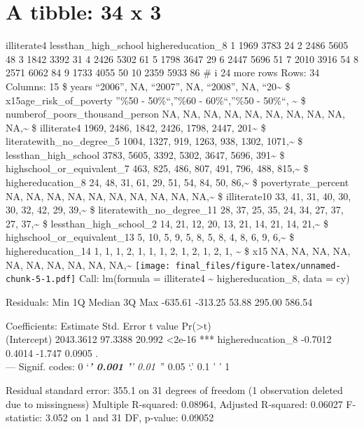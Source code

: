 \documentclass[
  12pt,
]{article}
\begin{document}
\hypertarget{a-tibble-34-x-3}{%
\section{A tibble: 34 x 3}\label{a-tibble-34-x-3}}

illiterate4 lessthan\_high\_school highereducation\_8
1 1969 3783 24
2 2486 5605 48
3 1842 3392 31
4 2426 5302 61
5 1798 3647 29
6 2447 5696 51
7 2010 3916 54
8 2571 6062 84
9 1733 4055 50
10 2359 5933 86
\# i 24 more rows
Rows: 34
Columns: 15
\$ years ``2006'', NA, ``2007'', NA, ``2008'', NA, ``20\textasciitilde{}
\$ x15age\_risk\_of\_poverty ''\%50 - 50\%``,''\%60 - 60\%``,''\%50 - 50\%``, \textasciitilde{}
\$ numberof\_poors\_thousand\_person NA, NA, NA, NA, NA, NA, NA, NA, NA, NA,\textasciitilde{}
\$ illiterate4 1969, 2486, 1842, 2426, 1798, 2447, 201\textasciitilde{}
\$ literatewith\_no\_degree\_5 1004, 1327, 919, 1263, 938, 1302, 1071,\textasciitilde{}
\$ lessthan\_high\_school 3783, 5605, 3392, 5302, 3647, 5696, 391\textasciitilde{}
\$ highschool\_or\_equivalent\_7 463, 825, 486, 807, 491, 796, 488, 815,\textasciitilde{}
\$ highereducation\_8 24, 48, 31, 61, 29, 51, 54, 84, 50, 86,\textasciitilde{}
\$ povertyrate\_percent NA, NA, NA, NA, NA, NA, NA, NA, NA, NA,\textasciitilde{}
\$ illiterate10 33, 41, 31, 40, 30, 30, 32, 42, 29, 39,\textasciitilde{}
\$ literatewith\_no\_degree\_11 28, 37, 25, 35, 24, 34, 27, 37, 27, 37,\textasciitilde{}
\$ lessthan\_high\_school\_2 14, 21, 12, 20, 13, 21, 14, 21, 14, 21,\textasciitilde{}
\$ highschool\_or\_equivalent\_13 5, 10, 5, 9, 5, 8, 5, 8, 4, 8, 6, 9, 6,\textasciitilde{}
\$ highereducation\_14 1, 1, 1, 2, 1, 1, 1, 2, 1, 2, 1, 2, 1, \textasciitilde{}
\$ x15 NA, NA, NA, NA, NA, NA, NA, NA, NA, NA,\textasciitilde{}
\texttt{[image: final\_files/figure-latex/unnamed-chunk-5-1.pdf]}
Call:
lm(formula = illiterate4 \textasciitilde{} highereducation\_8, data = cy)

Residuals:
Min 1Q Median 3Q Max
-635.61 -313.25 53.88 295.00 586.54

Coefficients:
Estimate Std. Error t value Pr(\textgreater\textbar t\textbar)\\
(Intercept) 2043.3612 97.3388 20.992 \textless2e-16 ***
highereducation\_8 -0.7012 0.4014 -1.747 0.0905 .\\
---
Signif. codes: 0 `\emph{\textbf{' 0.001 '}' 0.01 '}' 0.05 `.' 0.1 ' ' 1

Residual standard error: 355.1 on 31 degrees of freedom
(1 observation deleted due to missingness)
Multiple R-squared: 0.08964, Adjusted R-squared: 0.06027
F-statistic: 3.052 on 1 and 31 DF, p-value: 0.09052
\end{document}
